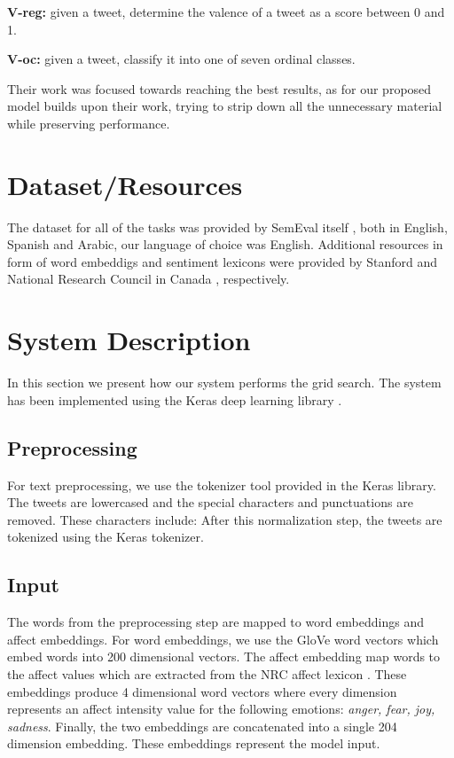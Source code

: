 \documentclass[10pt, a4paper]{article}
\begin{document}
\textbf{V-reg:} given a tweet, determine the valence of a tweet as a score between 0 and 1.

\textbf{V-oc:} given a tweet, classify it into one of seven ordinal classes.


Their work was focused towards reaching the best results, as for our proposed model builds upon their work, trying to strip down all the unnecessary material while preserving performance.

\section{Dataset/Resources}
The dataset for all of the tasks was provided by SemEval itself \citep{mohammed-semeval}, both in English, Spanish and Arabic, our language of choice was English. Additional resources in form of word embeddigs and sentiment lexicons were provided by Stanford \citep{glove} and National Research Council in Canada \citep{nrcic}, respectively. 


\section{System Description}
In this section we present how our system performs the grid search.
The system has been implemented using the Keras deep learning library \citep{chollet2015keras}.

\subsection{Preprocessing}
For text preprocessing, we use the tokenizer tool provided in the Keras library.
The tweets are lowercased and the special characters and
punctuations are removed.
These characters include: %
After this normalization step, the tweets are tokenized using the Keras tokenizer.

\subsection{Input}
The words from the preprocessing step are mapped to word embeddings
and affect embeddings.
For word embeddings, we use the GloVe word vectors \citep{glove} 
which embed words into 200 dimensional vectors.
The affect embedding map words to the affect values which are
extracted from the NRC affect lexicon \citep{mohammed-semeval}.
These embeddings produce 4 dimensional word vectors where every
dimension represents an affect intensity value for the following emotions: \textit{anger, fear, joy, sadness}.
Finally, the two embeddings are concatenated into a single 204 dimension embedding.
These embeddings represent the model input.
\end{document}
